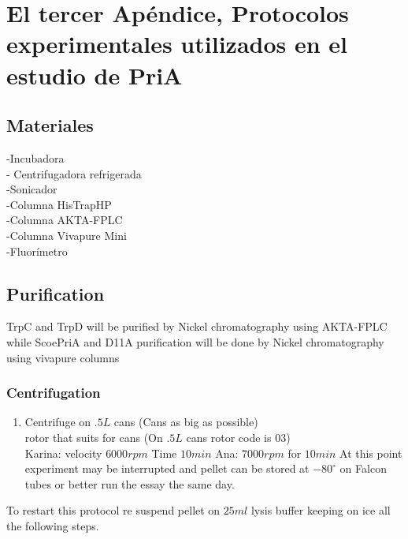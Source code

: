 \documentclass[12pt,twoside]{reedthesis}
\providecommand{\tightlist}{%
  \setlength{\itemsep}{0pt}\setlength{\parskip}{0pt}}
\begin{document}
{  \chapter{El tercer Apéndice, Protocolos experimentales utilizados en el
  estudio de
  PriA}\label{el-tercer-apendice-protocolos-experimentales-utilizados-en-el-estudio-de-pria}
  
  \section{Materiales}\label{materiales}
  
  -Incubadora\\
  - Centrifugadora refrigerada\\
  -Sonicador\\
  -Columna HisTrapHP\\
  -Columna AKTA-FPLC\\
  -Columna Vivapure Mini\\
  -Fluorímetro
  
  \section{Purification}\label{purification}
  
  TrpC and TrpD will be purified by Nickel chromatography using AKTA-FPLC
  while ScoePriA and D11A purification will be done by Nickel
  chromatography using vivapure columns
  
  \subsection{Centrifugation}\label{centrifugation}
  
  \begin{enumerate}
  \def\labelenumi{\arabic{enumi}.}
  \tightlist
  \item
    Centrifuge on \(.5L\) cans (Cans as big as possible)\\
    rotor that suits for cans (On \(.5L\) cans rotor code is 03)\\
    Karina: velocity \(6000 rpm\) Time \(10 min\) Ana: \(7000rpm\) for
    \(10 min\) At this point experiment may be interrupted and pellet can
    be stored at \(-80^{\circ}\) on Falcon tubes or better run the essay
    the same day.
  \end{enumerate}
  
  To restart this protocol re suspend pellet on \(25 ml\) lysis buffer
  keeping on ice all the following steps.
  
}
\end{document}

